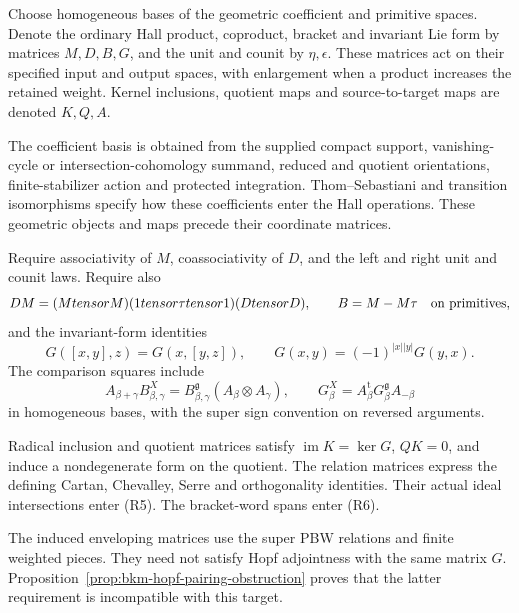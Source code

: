 \begin{definition}
\label{def:finite-source-proof-tables}
Choose homogeneous bases of the geometric coefficient and primitive
spaces. Denote the ordinary Hall product, coproduct, bracket and
invariant Lie form by matrices $M,D,B,G$, and the unit and counit
by $\eta,\epsilon$. These matrices act on their specified input
and output spaces, with enlargement when a product increases the
retained weight. Kernel inclusions, quotient maps and source-to-target
maps are denoted $K,Q,A$.

The coefficient basis is obtained from the supplied compact support,
vanishing-cycle or intersection-cohomology summand, reduced and
quotient orientations, finite-stabilizer action and protected
integration. Thom--Sebastiani and transition isomorphisms specify
how these coefficients enter the Hall operations. These geometric
objects and maps precede their coordinate matrices.

Require associativity of $M$, coassociativity of $D$, and the left
and right unit and counit laws. Require also
\[
 DM=(M\otimes M)(1\otimes\tau\otimes1)(D\otimes D),
 \qquad B=M-M\tau\quad\hbox{on primitives},
\]
and the invariant-form identities
\[
 G([x,y],z)=G(x,[y,z]),\qquad
 G(x,y)=(-1)^{|x||y|}G(y,x).
\]
The comparison squares include
\[
 A_{\beta+\gamma}B^X_{\beta,\gamma}
 =B^{\mathfrak g}_{\beta,\gamma}(A_\beta\otimes A_\gamma),
 \qquad
 G^X_\beta=A_\beta^{\mathrm t}G^{\mathfrak g}_\beta A_{-\beta}
\]
in homogeneous bases, with the super sign convention on reversed
arguments.

Radical inclusion and quotient matrices satisfy
$\operatorname{im}K=\ker G$, $QK=0$, and induce a nondegenerate
form on the quotient. The relation matrices express the defining
Cartan, Chevalley, Serre and orthogonality identities. Their actual
ideal intersections enter (R5). The bracket-word spans enter (R6).

The induced enveloping matrices use the super PBW relations and
finite weighted pieces. They need not satisfy Hopf adjointness
with the same matrix $G$. Proposition~\ref{prop:bkm-hopf-pairing-obstruction}
proves that the latter requirement is incompatible with this target.
\end{definition}

